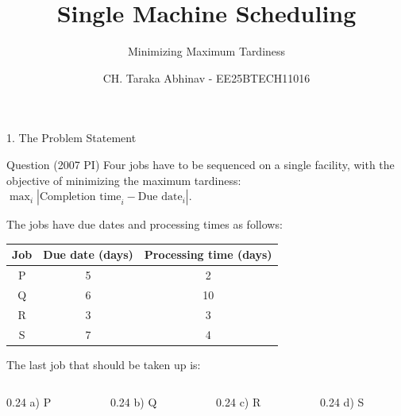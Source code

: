 \documentclass[12pt, aspectratio=169]{beamer}
\title{Single Machine Scheduling}
\subtitle{Minimizing Maximum Tardiness}
\author{CH. Taraka Abhinav - EE25BTECH11016}
\date{}
\begin{document}
\begin{frame}
    \titlepage
\end{frame}

\begin{frame}{1. The Problem Statement}
    \begin{block}{Question (2007 PI)}
        Four jobs have to be sequenced on a single facility, with the objective of minimizing the maximum tardiness: $\max_i |\text{Completion time}_i - \text{Due date}_i|$.
        
        \vspace{2mm}
        The jobs have due dates and processing times as follows:
        \begin{center}
            \small
            \begin{tabular}{c c c}
                \toprule
                \textbf{Job} & \textbf{Due date (days)} & \textbf{Processing time (days)} \tabularnewline
                \midrule
                P & 5 & 2 \tabularnewline
                Q & 6 & 10 \tabularnewline
                R & 3 & 3 \tabularnewline
                S & 7 & 4 \tabularnewline
                \bottomrule
            \end{tabular}
        \end{center}
        The last job that should be taken up is:

    
    \vspace{2mm}
    \begin{columns}
        \begin{column}{0.24\textwidth} \centering a) P \end{column}
        \begin{column}{0.24\textwidth} \centering b) Q \end{column}
        \begin{column}{0.24\textwidth} \centering c) R \end{column}
        \begin{column}{0.24\textwidth} \centering d) S \end{column}
    \end{columns}
    \end{block}
\end{frame}
\end{document}
